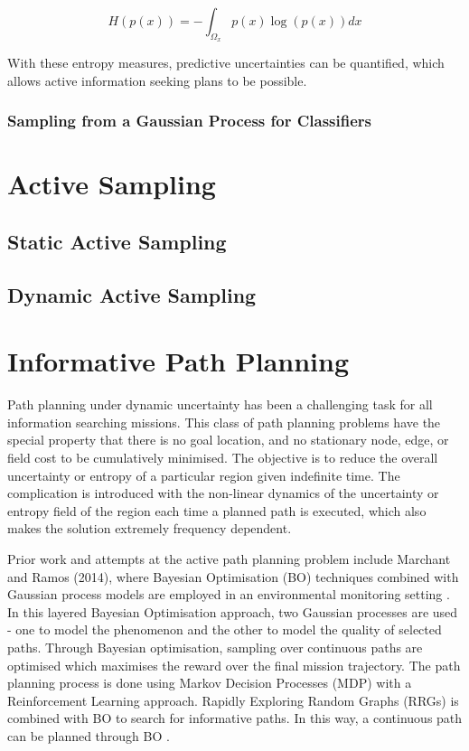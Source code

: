 				\begin{equation}
					H(p(x)) = - \int_{\Omega_{x}} p(x) \log(p(x)) dx
				\label{Background:GaussianProcess:Equation:ContinuousEntropy}
				\end{equation}
								
				With these entropy measures, predictive uncertainties can be quantified, which allows active information seeking plans to be possible.
				
			\subsubsection{Sampling from a Gaussian Process for Classifiers}
			
	\section{Active Sampling}
	
		\subsection{Static Active Sampling}
		
		\subsection{Dynamic Active Sampling}
	
	\section{Informative Path Planning}
	
		Path planning under dynamic uncertainty has been a challenging task for all information searching missions. This class of path planning problems have the special property that there is no goal location, and no stationary node, edge, or field cost to be cumulatively minimised. The objective is to reduce the overall uncertainty or entropy of a particular region given indefinite time. The complication is introduced with the non-linear dynamics of the uncertainty or entropy field of the region each time a planned path is executed, which also makes the solution extremely frequency dependent.
		
		Prior work and attempts at the active path planning problem include Marchant and Ramos (2014), where Bayesian Optimisation (BO) techniques combined with Gaussian process models are employed in an environmental monitoring setting \citep{BayesianOptimisation}. In this layered Bayesian Optimisation approach, two Gaussian processes are used - one to model the phenomenon and the other to model the quality of selected paths. Through Bayesian optimisation, sampling over continuous paths are optimised which maximises the reward over the final mission trajectory. The path planning process is done using Markov Decision Processes (MDP) with a Reinforcement Learning approach. Rapidly Exploring Random Graphs (RRGs) is combined with BO to search for informative paths. In this way, a continuous path can be planned through BO \citep{BayesianOptimisation}.
		
